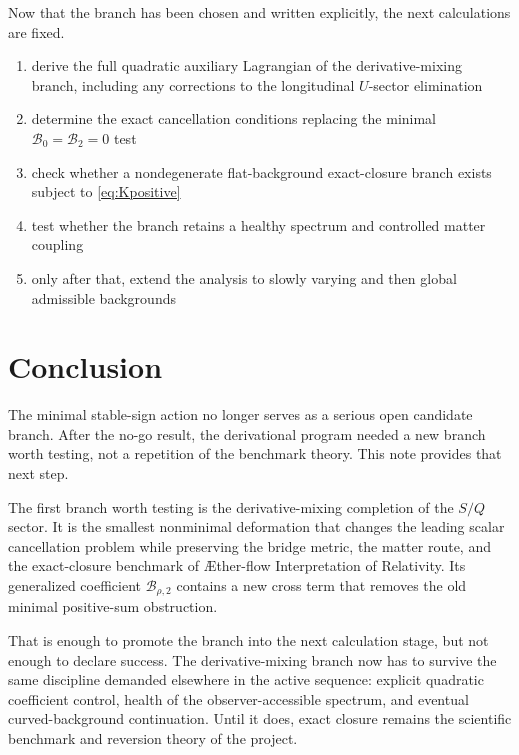 \documentclass[11pt]{article}
\newcommand{\Aflow}{\AE{}ther-flow}
\newcommand{\TheoryName}{\Aflow{} Interpretation of Relativity}
\begin{document}
Now that the branch has been chosen and written explicitly, the next calculations are fixed.
\begin{enumerate}
    \item derive the full quadratic auxiliary Lagrangian of the derivative-mixing branch, including any corrections to the longitudinal \(U\)-sector elimination
    \item determine the exact cancellation conditions replacing the minimal \(\mathcal B_0=\mathcal B_2=0\) test
    \item check whether a nondegenerate flat-background exact-closure branch exists subject to \eqref{eq:Kpositive}
    \item test whether the branch retains a healthy spectrum and controlled matter coupling
    \item only after that, extend the analysis to slowly varying and then global admissible backgrounds
\end{enumerate}

\section{Conclusion}

The minimal stable-sign action no longer serves as a serious open candidate branch. After the no-go result, the derivational program needed a new branch worth testing, not a repetition of the benchmark theory. This note provides that next step.

The first branch worth testing is the derivative-mixing completion of the \(S/Q\) sector. It is the smallest nonminimal deformation that changes the leading scalar cancellation problem while preserving the bridge metric, the matter route, and the exact-closure benchmark of \TheoryName{}. Its generalized coefficient \(\mathcal B_{\rho,2}\) contains a new cross term that removes the old minimal positive-sum obstruction.

That is enough to promote the branch into the next calculation stage, but not enough to declare success. The derivative-mixing branch now has to survive the same discipline demanded elsewhere in the active sequence: explicit quadratic coefficient control, health of the observer-accessible spectrum, and eventual curved-background continuation. Until it does, exact closure remains the scientific benchmark and reversion theory of the project.
\end{document}
